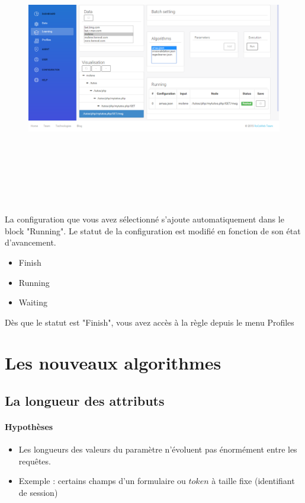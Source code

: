 \documentclass[a4paper,10pt,justified,openany]{tufte-book}
\begin{document}
\begin{figure}
\includegraphics[width=15cm, height=12cm]{./images/learning.png}
\label{iconevueapprentissage}
\end{figure}
La configuration que vous avez sélectionné s'ajoute automatiquement dans le block "Running". Le statut de la configuration est modifié en fonction de son état d'avancement.  

\begin{itemize}
\item Finish
\item Running
\item Waiting
\end{itemize}

Dès que le statut est "Finish", vous avez accès à la règle depuis le menu Profiles

\section{Les nouveaux algorithmes}

\subsection{La longueur des attributs}
 \paragraph{Hypothèses}
  \begin{itemize}
   \item Les longueurs des valeurs du paramètre n'évoluent pas énormément entre les requêtes. 
   \item Exemple : certains champs d'un formulaire ou $token$ à taille fixe (identifiant de session) 
  \end{itemize}
 
\end{document}
